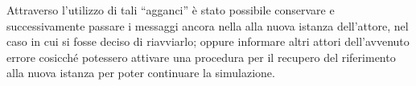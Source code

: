 Attraverso l'utilizzo di tali ``agganci'' è stato possibile conservare e successivamente passare i messaggi ancora nella  alla nuova istanza dell'attore, nel caso in cui si fosse deciso di riavviarlo; oppure informare altri attori dell'avvenuto errore cosicché potessero attivare una procedura per il recupero del riferimento alla nuova istanza per poter continuare la simulazione.